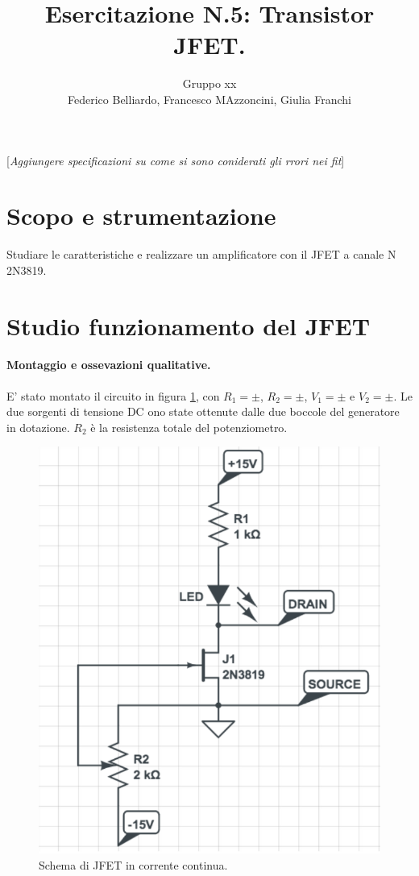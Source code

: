 \documentclass[10pt,a4paper]{article}
\author{Gruppo xx \\ Federico Belliardo, Francesco MAzzoncini, Giulia Franchi}
\title{Esercitazione N.5: Transistor JFET.}
\newcommand{\rem}[1]{[\emph{#1}]}
\begin{document}
\maketitle

\rem{Aggiungere specificazioni su come si sono coniderati gli rrori nei fit}
\section{Scopo e strumentazione}
Studiare le caratteristiche e realizzare un amplificatore con il JFET a canale N 2N3819.


\section{Studio funzionamento del JFET}
\paragraph{Montaggio e ossevazioni qualitative.}
E' stato montato il circuito in figura \ref{circuito1}, con  $R_1 = \pm$, $R_2 = \pm$, $V_1 = \pm $ e $V_2 = \pm$. Le due sorgenti di tensione DC ono state ottenute dalle due boccole del generatore in dotazione. $R_2$ è la resistenza totale del potenziometro.

\begin{figure}
\centering
\includegraphics[scale=0.4]{circuito1.png}
\caption{Schema di JFET in corrente continua.\label{circuito1}}
\end{figure}
\end{document}
